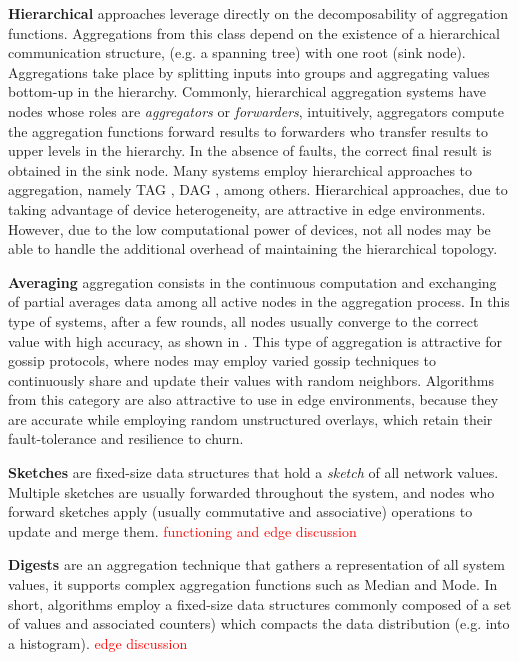 \textbf{Hierarchical} approaches leverage directly on the decomposability of aggregation functions. Aggregations from this class depend on the existence of a hierarchical communication structure, (e.g. a spanning tree) with one root (sink node). Aggregations take place by splitting inputs into groups and aggregating values bottom-up in the hierarchy. Commonly, hierarchical aggregation systems have nodes whose roles are \textit{aggregators} or \textit{forwarders}, intuitively, aggregators compute the aggregation functions forward results to forwarders who transfer results to upper levels in the hierarchy. In the absence of faults, the correct final result is obtained in the sink node. Many systems employ hierarchical approaches to aggregation, namely TAG \cite{}, DAG \cite{}, among others. Hierarchical approaches, due to taking advantage of device heterogeneity, are attractive in edge environments. However, due to the low computational power of devices, not all nodes may be  able to handle the additional overhead of maintaining the hierarchical topology.

\textbf{Averaging} aggregation consists in the continuous computation and exchanging of partial averages data among all active nodes in the aggregation process. In this type of systems, after a few rounds, all nodes usually converge to the correct value with high accuracy, as shown in \cite{gossip_aggregation}. This type of aggregation is attractive for gossip protocols, where nodes may employ varied gossip techniques to continuously share and update their values with random neighbors. Algorithms from this category are also attractive to use in edge environments, because they are accurate while employing random unstructured overlays, which retain their fault-tolerance and resilience to churn.

\textbf{Sketches} are fixed-size data structures that hold a \textit{sketch} of all network values. Multiple sketches are usually forwarded throughout the system, and nodes who forward sketches apply (usually commutative and associative) operations to update and merge them. \textcolor{red}{functioning and edge discussion}


\textbf{Digests} are an aggregation technique that gathers a representation of all system values, it supports complex aggregation functions such as Median and Mode. In short, algorithms employ a fixed-size data structures commonly composed of a set of values and associated counters) which compacts the data distribution (e.g. into a histogram). \textcolor{red}{edge discussion}

